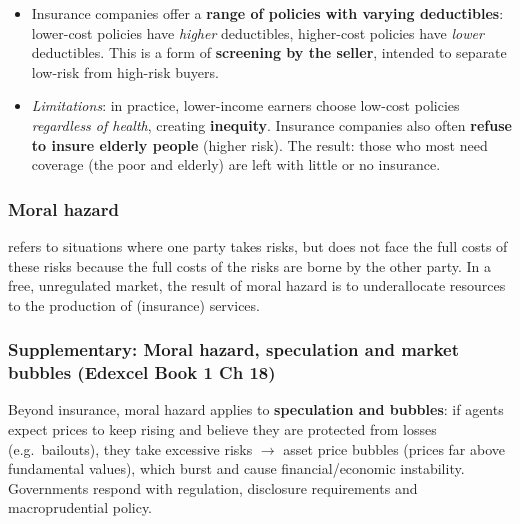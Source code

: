 \begin{itemize}
\begin{itemize}
\begin{itemize}
      \item Insurance companies offer a \textbf{range of policies with varying deductibles}: lower-cost policies have \textit{higher} deductibles, higher-cost policies have \textit{lower} deductibles. This is a form of \textbf{screening by the seller}, intended to separate low-risk from high-risk buyers.
      \item \textit{Limitations}: in practice, lower-income earners choose low-cost policies \textit{regardless of health}, creating \textbf{inequity}. Insurance companies also often \textbf{refuse to insure elderly people} (higher risk). The result: those who most need coverage (the poor and elderly) are left with little or no insurance.
    \end{itemize}
  \end{itemize}
\end{itemize}
\subsubsection*{Moral hazard}
 refers to situations where one party takes risks, but does not face the full costs of these risks because the full costs of the risks are borne by the other party. In a free, unregulated market, the result of moral hazard is to underallocate resources to the production of (insurance) services.
\subsubsection*{Supplementary: Moral hazard, speculation and market bubbles (Edexcel Book 1 Ch 18)}
Beyond insurance, moral hazard applies to \textbf{speculation and bubbles}: if agents expect prices to keep rising and believe they are protected from losses (e.g.\ bailouts), they take excessive risks $\to$ asset price bubbles (prices far above fundamental values), which burst and cause financial/economic instability. Governments respond with regulation, disclosure requirements and macroprudential policy.
